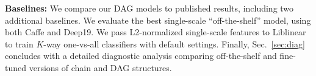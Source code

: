 \documentclass[10pt,twocolumn,letterpaper]{article}
\begin{document}
%
%


{\bf Baselines:} We compare our DAG models to published results, including two additional baselines. We evaluate the best single-scale ``off-the-shelf'' model, using both Caffe and Deep19. We pass L2-normalized single-scale features to Liblinear~\cite{liblinear} to train $K$-way one-vs-all classifiers with default settings. Finally, Sec.~\ref{sec:diag} concludes with a detailed diagnostic analysis comparing off-the-shelf and fine-tuned versions of chain and DAG structures.

\end{document}
